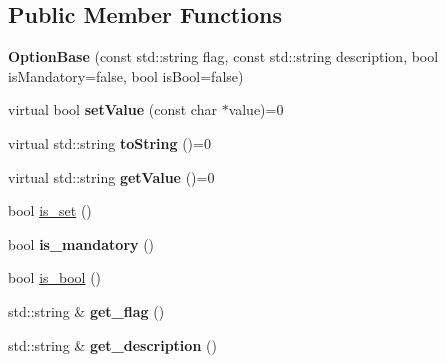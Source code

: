 \subsection*{Public Member Functions}
\begin{DoxyCompactItemize}
\item 
\hypertarget{class_option_base_a029eeb909ef442e37b60695d36f76304}{}\label{class_option_base_a029eeb909ef442e37b60695d36f76304} 
{\bfseries Option\+Base} (const std\+::string flag, const std\+::string description, bool is\+Mandatory=false, bool is\+Bool=false)
\item 
\hypertarget{class_option_base_a9d0096b696a7981b56f7f8967fa88ce0}{}\label{class_option_base_a9d0096b696a7981b56f7f8967fa88ce0} 
virtual bool {\bfseries set\+Value} (const char $\ast$value)=0
\item 
\hypertarget{class_option_base_a0f73d962b8ee7356c4b37a79b5be7547}{}\label{class_option_base_a0f73d962b8ee7356c4b37a79b5be7547} 
virtual std\+::string {\bfseries to\+String} ()=0
\item 
\hypertarget{class_option_base_a2604824b0aaaa07711eceec8abb278bc}{}\label{class_option_base_a2604824b0aaaa07711eceec8abb278bc} 
virtual std\+::string {\bfseries get\+Value} ()=0
\item 
bool \hyperlink{class_option_base_a9cbf7eb440a51dde21dadba4d4844c6d}{is\+\_\+set} ()
\item 
\hypertarget{class_option_base_a336e3c9a12991bd753010b3a5c649f78}{}\label{class_option_base_a336e3c9a12991bd753010b3a5c649f78} 
bool {\bfseries is\+\_\+mandatory} ()
\item 
bool \hyperlink{class_option_base_a082825b91ec72a250b6c04a4d65ec1ec}{is\+\_\+bool} ()
\item 
\hypertarget{class_option_base_a56f57277a738713bfa096113854591fd}{}\label{class_option_base_a56f57277a738713bfa096113854591fd} 
std\+::string \& {\bfseries get\+\_\+flag} ()
\item 
\hypertarget{class_option_base_a85d970613c917b92194f3dae27ac337a}{}\label{class_option_base_a85d970613c917b92194f3dae27ac337a} 
std\+::string \& {\bfseries get\+\_\+description} ()
\end{DoxyCompactItemize}
